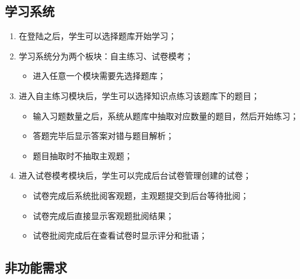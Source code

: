 \documentclass{article}
\begin{document}
    \subsection{学习系统}
    	\begin{enumerate}
    		\item 在登陆之后，学生可以选择题库开始学习；
    		\item 学习系统分为两个板块：自主练习、试卷模考；
    		\begin{itemize}
    			\item 进入任意一个模块需要先选择题库；
    		\end{itemize}
    		\item 进入自主练习模块后，学生可以选择知识点练习该题库下的题目；
    		\begin{itemize}
    			\item 输入习题数量之后，系统从题库中抽取对应数量的题目，然后开始练习；
    			\item 答题完毕后显示答案对错与题目解析；
    			\item 题目抽取时不抽取主观题；
    		\end{itemize}
   			\item 进入试卷模考模块后，学生可以完成后台试卷管理创建的试卷；
   			\begin{itemize}
   				\item 试卷完成后系统批阅客观题，主观题提交到后台等待批阅；
   				\item 试卷完成后直接显示客观题批阅结果；
   				\item 试卷批阅完成后在查看试卷时显示评分和批语；
   			\end{itemize}
    	\end{enumerate}
    \subsection{非功能需求}
\end{document}
